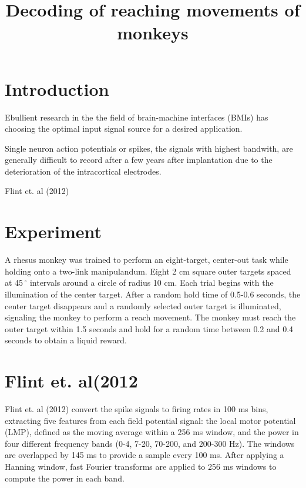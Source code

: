 \documentclass{article}
\begin{document}
\title{Decoding of reaching movements of monkeys}
\maketitle


\section{Introduction}

Ebullient research in the the field of brain-machine interfaces (BMIs) has 
choosing the optimal input signal source for a desired application.  

Single neuron action potentials or spikes, the signals with highest bandwith, are generally difficult to record after a few years after implantation due to the deterioration of the intracortical electrodes.  




Flint et. al (2012) 



\section{Experiment}
A rhesus monkey was trained to perform an eight-target, center-out task while holding onto a two-link manipulandum.  Eight 2 cm square outer targets spaced at 45$\,^{\circ}$ intervals around a circle of radius 10 cm.  Each trial begins with the illumination of the center target.  After a random hold time of 0.5-0.6 seconds, the center target disappears and a randomly selected outer target is illuminated, signaling the monkey to perform a reach movement.  The monkey must reach the outer target within 1.5 seconds and hold for a random time between 0.2 and 0.4 seconds to obtain a liquid reward.  

\section{Flint et. al(2012}
\noindent
Flint et. al (2012) convert the spike signals to firing rates in 100 ms bins, extracting five features from each field potential signal:  the local motor potential (LMP), defined as the moving average within a 256 ms window, and the power in four different frequency bands (0-4, 7-20, 70-200, and 200-300 Hz).  The windows are overlapped by 145 ms to provide a sample every 100 ms.  After applying a Hanning window, fast Fourier transforms are applied to 256 ms windows to compute the power in each band.   \\
\end{document}
